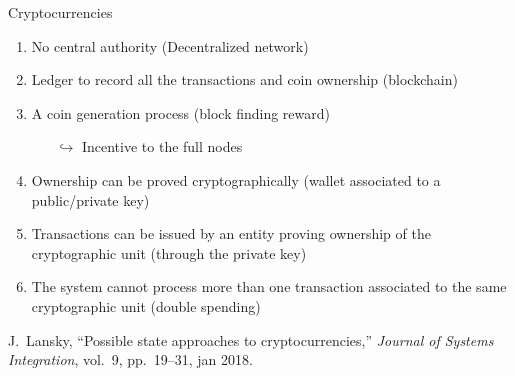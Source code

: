 \documentclass{beamer}
\begin{document}
\begin{frame}{Cryptocurrencies}

\begin{enumerate}
  \item No central authority (Decentralized network)
  \item Ledger to record all the transactions and coin ownership (blockchain)
  \item A coin generation process (block finding reward)
    \begin{itemize}
    \item[$\hookrightarrow$] Incentive to the full nodes 
  \end{itemize}
  \item Ownership can be proved cryptographically (wallet associated to a public/private key)
  \item Transactions can be issued by an entity proving ownership of the cryptographic unit (through the private key) 
  \item The system cannot process more than one transaction associated to the same cryptographic unit (double spending)
\end{enumerate}
\tiny
\begin{thebibliography}{1}

J.~Lansky, ``Possible state approaches to cryptocurrencies,'' {\em Journal of
  Systems Integration}, vol.~9, pp.~19--31, jan 2018.

\end{thebibliography}
\end{frame}
\end{document}
